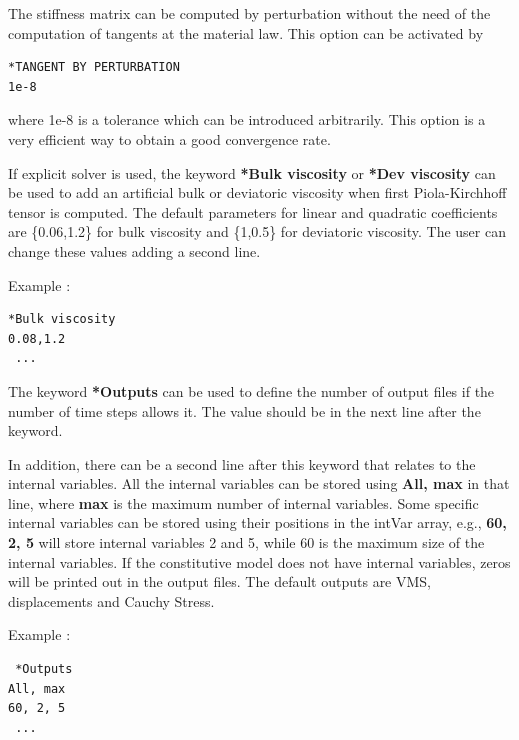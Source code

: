 \documentclass[oneside,11pt,times]{book}
\begin{document}
The stiffness matrix can be computed by perturbation without the need of the computation of tangents at the material law. This option can be activated by
\begin{lstlisting}
*TANGENT BY PERTURBATION
1e-8
\end{lstlisting}
where 1e-8 is a tolerance which can be introduced arbitrarily. This option is a very efficient way to obtain a good convergence rate.

If explicit solver is used, the keyword \textbf{*Bulk viscosity} or \textbf{*Dev viscosity} can be used to add an artificial bulk or deviatoric viscosity when first Piola-Kirchhoff tensor is computed. The default parameters for linear and quadratic coefficients are \{0.06,1.2\} for bulk viscosity and \{1,0.5\} for deviatoric viscosity. The user can change these values adding a second line.

Example :
\begin{lstlisting}
*Bulk viscosity
0.08,1.2
 ...
\end{lstlisting}

The keyword \textbf{*Outputs} can be used to define the number of output files if the number of time steps allows it. The value should be in the next line after the keyword.

In addition, there can be a second line after this keyword that relates to the internal variables. All the internal variables can be stored using \textbf{All, max} in that line, where \textbf{max} is the maximum number of internal variables. Some specific internal variables can be stored using their positions in the intVar array, e.g.,  \textbf{60, 2, 5} will store internal variables 2 and 5, while 60 is the maximum size of the internal variables. If the constitutive model does not have internal variables, zeros will be printed out in the output files. The default outputs are VMS, displacements and Cauchy Stress.

Example :

\begin{lstlisting}
 *Outputs
All, max
60, 2, 5
 ...
\end{lstlisting}
\end{document}

